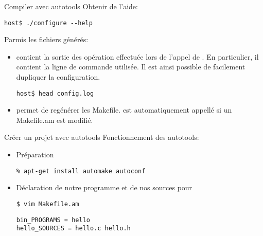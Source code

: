 \begin{frame}[fragile=singleslide]{Compiler avec autotools}
  Obtenir de l'aide:
\begin{lstlisting}
host$ ./configure --help
\end{lstlisting} %

  Parmis les fichiers générés:
  \begin{itemize}
  \item {}  contient la sortie  des opération effectuée
    lors de l'appel de .  En particulier, il contient
    la ligne de commande utilisée. Il est ainsi possible de facilement
    dupliquer la configuration.
\begin{lstlisting}
host$ head config.log
\end{lstlisting} %
  \item     {}     permet     de    regénérer     les
    Makefile.   est  automatiquement appellé  si un
    Makefile.am est modifié.
  \end{itemize}
\end{frame}


\begin{frame}[fragile=singleslide]{Créer un projet avec autotools}
  Fonctionnement des autotools:
  \begin{itemize}
  \item Préparation
\begin{lstlisting}
% apt-get install automake autoconf
\end{lstlisting}
  \item Déclaration de notre programme et de nos sources pour 
\begin{lstlisting}
$ vim Makefile.am
\end{lstlisting} %
\begin{lstlisting}
bin_PROGRAMS = hello
hello_SOURCES = hello.c hello.h
\end{lstlisting}
  \end{itemize}
\end{frame}

